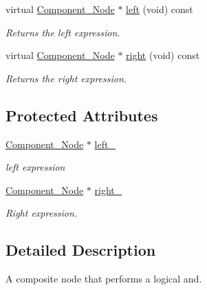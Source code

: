 \begin{DoxyCompactItemize}
virtual \hyperlink{classMadara_1_1Expression__Tree_1_1Component__Node}{Component\_\-Node} $\ast$ \hyperlink{classMadara_1_1Expression__Tree_1_1Composite__Binary__Node_a6ca5cccbc46ccc6026c18f9665298380}{left} (void) const 
\begin{DoxyCompactList}\small\item\em Returns the left expression. \item\end{DoxyCompactList}\item 
virtual \hyperlink{classMadara_1_1Expression__Tree_1_1Component__Node}{Component\_\-Node} $\ast$ \hyperlink{classMadara_1_1Expression__Tree_1_1Composite__Unary__Node_ade55cde5707e0fa73ab1c019159b9aec}{right} (void) const 
\begin{DoxyCompactList}\small\item\em Returns the right expression. \item\end{DoxyCompactList}\end{DoxyCompactItemize}
\subsection*{Protected Attributes}
\begin{DoxyCompactItemize}
\item 
\hyperlink{classMadara_1_1Expression__Tree_1_1Component__Node}{Component\_\-Node} $\ast$ \hyperlink{classMadara_1_1Expression__Tree_1_1Composite__Binary__Node_acac60a70beb2484737e6e7161edb2d1b}{left\_\-}
\begin{DoxyCompactList}\small\item\em left expression \item\end{DoxyCompactList}\item 
\hyperlink{classMadara_1_1Expression__Tree_1_1Component__Node}{Component\_\-Node} $\ast$ \hyperlink{classMadara_1_1Expression__Tree_1_1Composite__Unary__Node_a077b7bd1b52df6f5c6adfde735556a68}{right\_\-}
\begin{DoxyCompactList}\small\item\em Right expression. \item\end{DoxyCompactList}\end{DoxyCompactItemize}


\subsection{Detailed Description}
A composite node that performs a logical and. 

